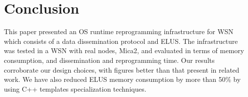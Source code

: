 \section{Conclusion}
\label{sec:conc}
This paper presented an OS runtime reprogramming infrastructure for WSN which consists of a data dissemination protocol and ELUS. %
The infrastructure was tested in a WSN with real nodes, Mica2, and evaluated in terms of memory consumption, and dissemination and reprogramming time.
Our results corroborate our design choices, with figures better than that present in related work.
We have also reduced ELUS memory consumption by more than 50\% by using C++ templates specialization techniques.

